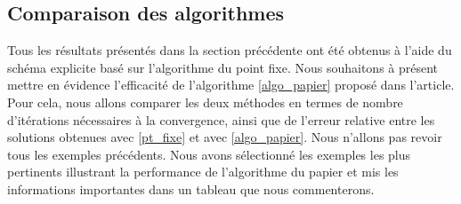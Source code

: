 \subsection{Comparaison des algorithmes}
Tous les résultats présentés dans la section précédente ont été obtenus à l’aide du schéma explicite basé sur l’algorithme du point fixe. Nous souhaitons à présent mettre en évidence l’efficacité de l’algorithme \eqref{algo_papier} proposé dans l’article. Pour cela, nous allons comparer les deux méthodes en termes de nombre d’itérations nécessaires à la convergence, ainsi que de l’erreur relative entre les solutions obtenues avec \eqref{pt_fixe} et avec \eqref{algo_papier}. Nous n'allons pas revoir tous les exemples précédents. Nous avons sélectionné les exemples les plus pertinents illustrant la performance de l'algorithme du papier et mis les informations importantes dans un tableau que nous commenterons. 

